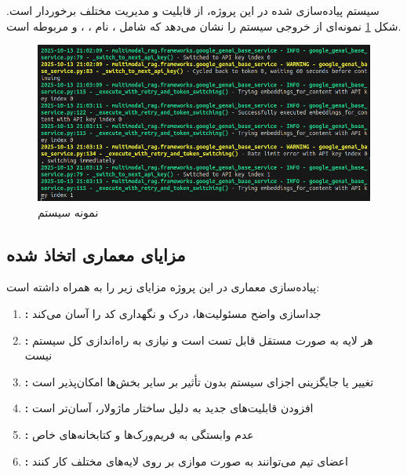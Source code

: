 \noindent
سیستم  پیاده‌سازی شده در این پروژه، از قابلیت  و مدیریت  مختلف برخوردار است. شکل \ref{fig:logging_example} نمونه‌ای از خروجی سیستم  را نشان می‌دهد که شامل ، نام ، ، و  مربوطه است.

\begin{figure}[h]
    \centering
    \includegraphics[width=\textwidth]{logging_example.png}
    \caption{نمونه  سیستم }
    \label{fig:logging_example}
\end{figure}

\subsection{مزایای معماری اتخاذ شده}

پیاده‌سازی معماری  در این پروژه مزایای زیر را به همراه داشته است:

\begin{enumerate}
    \item \textbf{:} جداسازی واضح مسئولیت‌ها، درک و نگهداری کد را آسان می‌کند
    
    \item \textbf{:} هر لایه به صورت مستقل قابل تست است و نیازی به راه‌اندازی کل سیستم نیست
    
    \item \textbf{:} تغییر یا جایگزینی اجزای سیستم بدون تأثیر بر سایر بخش‌ها امکان‌پذیر است

    \item \textbf{:} افزودن قابلیت‌های جدید به دلیل ساختار ماژولار، آسان‌تر است

    \item \textbf{:} عدم وابستگی به فریم‌ورک‌ها و کتابخانه‌های خاص

    \item \textbf{:} اعضای تیم می‌توانند به صورت موازی بر روی لایه‌های مختلف کار کنند
\end{enumerate}

